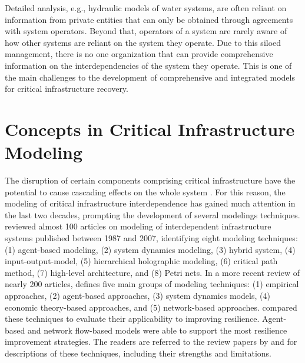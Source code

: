 Detailed analysis, e.g., hydraulic models of water systems, are often reliant on information from private entities that can only be obtained through agreements with system operators. Beyond that, operators of a system are rarely aware of how other systems are reliant on the system they operate. Due to this siloed management, there is no one organization that can provide comprehensive information on the interdependencies of the system they operate. This is one of the main challenges to the development of comprehensive and integrated models for critical infrastructure recovery.\ 

\section{Concepts in Critical Infrastructure Modeling}
The disruption of certain components comprising critical infrastructure have the potential to cause cascading effects on the whole system \citep{rinaldi2001identifying}. For this reason, the modeling of critical infrastructure interdependence has gained much attention in the last two decades, prompting the development of  several modelings techniques. \citet{Eusgeld2008a} reviewed almost 100 articles on modeling of interdependent infrastructure systems published between 1987 and 2007, identifying eight modeling techniques: (1) agent-based modeling, (2) system dynamics modeling, (3) hybrid system, (4) input-output-model, (5) hierarchical holographic modeling, (6) critical path method, (7) high-level architecture, and (8) Petri nets. In a more recent review of nearly 200 articles, \citet{ouyang2014review} defines five main groups of modeling techniques: (1) empirical approaches, (2) agent-based approaches, (3) system dynamics models, (4) economic theory-based approaches, and (5) network-based approaches. \citet{ouyang2014review} compared these techniques to evaluate their applicability to improving resilience. Agent-based and network flow-based models were able to support the most resilience improvement strategies. The readers are referred to the review papers by \citet{Eusgeld2008a} and \citet{ouyang2014review} for descriptions of these techniques, including their strengths and limitations. \ 

